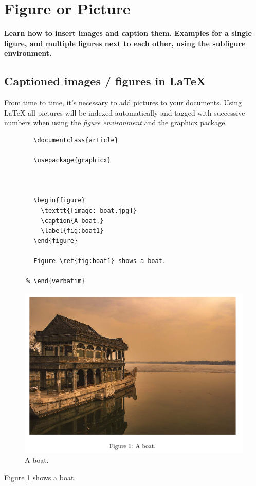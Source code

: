 \maketitle
\newpage

\section{Figure or Picture}
  \textbf{Learn how to insert images and caption them. 
    Examples for a single figure, and multiple figures 
    next to each other, using the subfigure environment.}
  \subsection{Captioned images / figures in LaTeX}
    From time to time, it's necessary to add pictures
    to your documents. Using LaTeX all pictures will 
    be indexed automatically and tagged with successive
    numbers when using the \textit{figure environment} 
    and the graphicx package.


    \begin{lstlisting}[language={[LaTeX]TeX}, breaklines=true,frame=single]
      % \begin{verbatim}
        \documentclass{article}
    
        \usepackage{graphicx}
        
        
        
        \begin{figure}
          \texttt{[image: boat.jpg]}
          \caption{A boat.}
          \label{fig:boat1}
        \end{figure}
        
        Figure \ref{fig:boat1} shows a boat.
        
      % \end{verbatim}
    \end{lstlisting}

    \begin{figure}[h!]
      \includegraphics[width=\linewidth]{graphics/boat.png}
      \caption{A boat.}
      \label{fig:boat1}
      \end{figure}
      Figure \ref{fig:boat1} shows a boat. 

